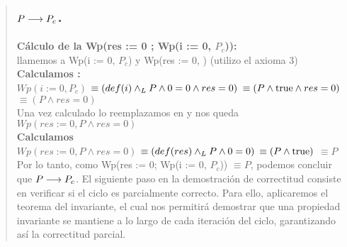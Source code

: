 \documentclass[10pt,a4paper]{article}
\begin{document}
\begin{quote}
 \subsection{\textbf{$P \longrightarrow P_c$}.}
 \textbf{Cálculo de la Wp(res := 0 ; Wp(i := 0, $P_c$)):} \\[0.2cm]
 llamemos  a Wp(i := 0, $P_c$) y  Wp(res := 0, ) (utilizo el axioma 3) \\[0.2cm]
 \textbf{Calculamos :} \\[0.2cm]
 $Wp(i := 0, P_c)$ $\equiv(def(i) \land _L P \land 0 = 0 \land res = 0)$ $\equiv (P \land \mathrm{true} \land res = 0)$ $\equiv (P \land res = 0)$ \\[0.2cm]
 Una vez calculado  lo reemplazamos en  y nos queda $Wp(res := 0, P \land res = 0)$ \\[0.2cm]
 \textbf{Calculamos } \\[0.2cm]
 $Wp(res := 0, P \land res = 0)$ $\equiv (def(res) \land _L P \land 0 = 0)$ $\equiv (P \land \mathrm{true})$ $\equiv P$ \\[0.2cm]
 Por lo tanto, como Wp(res := 0; Wp(i := 0, $P_c$)) $\equiv P$, podemos concluir que $P \longrightarrow P_c$. El siguiente paso en la demostración de correctitud consiste en verificar si el ciclo es parcialmente correcto. Para ello, aplicaremos el teorema del invariante, el cual nos permitirá demostrar que una propiedad invariante se mantiene a lo largo de cada iteración del ciclo, garantizando así la correctitud parcial. 

\end{quote}
\end{document}
